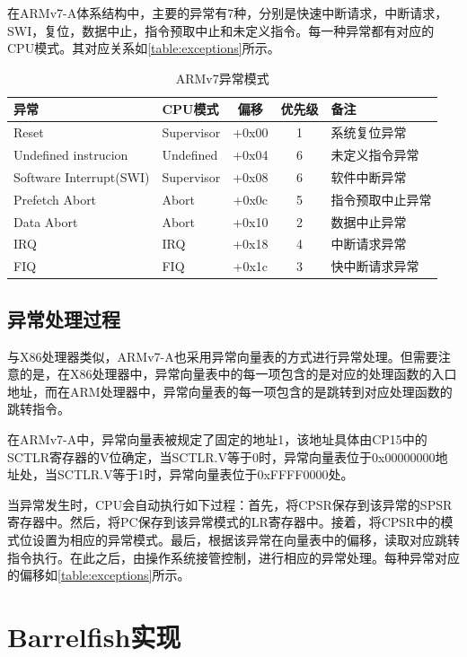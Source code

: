 \documentclass[a4paper, 12pt]{report}
\begin{document}
    在ARMv7-A体系结构中，主要的异常有7种，分别是快速中断请求，中断请求，SWI，复位，数据中止，指令预取中止和未定义指令。每一种异常都有对应的CPU模式。其对应关系如\autoref{table:exceptions}所示。
    
    \begin{table}[htbp]
    \centering
    \caption{ARMv7异常模式}
    \label{table:exceptions}
    \begin{tabular}{llccl}
        \toprule
        异常 & CPU模式 & 偏移 & 优先级 & 备注 \\
        \midrule
        Reset & Supervisor & +0x00 & 1 & 系统复位异常 \\
        Undefined instrucion & Undefined & +0x04 & 6 & 未定义指令异常 \\
        Software Interrupt(SWI) & Supervisor & +0x08 & 6 & 软件中断异常 \\
        Prefetch Abort & Abort & +0x0c & 5 & 指令预取中止异常 \\
        Data Abort & Abort & +0x10 & 2 & 数据中止异常 \\
        IRQ & IRQ & +0x18 & 4 & 中断请求异常 \\
        FIQ & FIQ & +0x1c & 3 & 快中断请求异常 \\
        \bottomrule
    \end{tabular}
    \end{table}
    
    \subsection{异常处理过程}
    
    与X86处理器类似，ARMv7-A也采用异常向量表的方式进行异常处理。但需要注意的是，在X86处理器中，异常向量表中的每一项包含的是对应的处理函数的入口地址，而在ARM处理器中，异常向量表的每一项包含的是跳转到对应处理函数的跳转指令。
    
    在ARMv7-A中，异常向量表被规定了固定的地址1，该地址具体由CP15中的SCTLR寄存器的V位确定，当SCTLR.V等于0时，异常向量表位于0x00000000地址处，当SCTLR.V等于1时，异常向量表位于0xFFFF0000处。
    
    当异常发生时，CPU会自动执行如下过程：首先，将CPSR保存到该异常的SPSR寄存器中。然后，将PC保存到该异常模式的LR寄存器中。接着，将CPSR中的模式位设置为相应的异常模式。最后，根据该异常在向量表中的偏移，读取对应跳转指令执行。在此之后，由操作系统接管控制，进行相应的异常处理。每种异常对应的偏移如\autoref{table:exceptions}所示。
	
	\section{Barrelfish实现}
    
\end{document}
